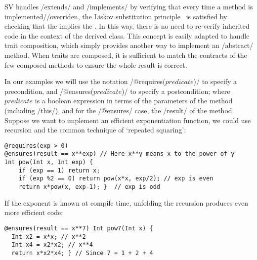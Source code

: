 SV handles /extends/ and /implements/ by verifying that every 
time a method is implemented//overriden, 
the Liskov substitution principle~\cite{Liskov:1994:BNS:197320.197383} is satisfied
by checking that the   implies the  . 
 In this way, there is no need to re-verify
inherited code in the context of the derived class.
This concept is easily adapted
to handle trait composition, which simply provides another way to implement an /abstract/ method.
When traits are composed,
it is sufficient
to match the contracts of the few composed methods
to ensure the whole result is correct.

In our examples we will use the notation /@requires($predicate$)/ 
to specify a precondition, and /@ensures($predicate$)/ 
to specify a postcondition; where $predicate$ is a boolean expression
in terms of the parameters of the method (including /this/), and for the /@ensures/ case, the /result/ of the method.
Suppose we want to implement an efficient exponentiation function, we could use recursion and the common technique of `repeated squaring':
\vspace{-1ex}
\begin{lstlisting}
@requires(exp > 0)
@ensures(result == x**exp) // Here x**y means x to the power of y
Int pow(Int x, Int exp) {
	if (exp == 1) return x;
	if (exp %2 == 0) return pow(x*x, exp/2); // exp is even
	return x*pow(x, exp-1); }  // exp is odd
\end{lstlisting}
If the exponent is known at compile time,
unfolding the recursion produces even more efficient code:
\vspace{-1ex}
\begin{lstlisting}
@ensures(result == x**7) Int pow7(Int x) { 
  Int x2 = x*x; // x**2
  Int x4 = x2*x2; // x**4
  return x*x2*x4; } // Since 7 = 1 + 2 + 4
\end{lstlisting}
\vspace{-1ex}


